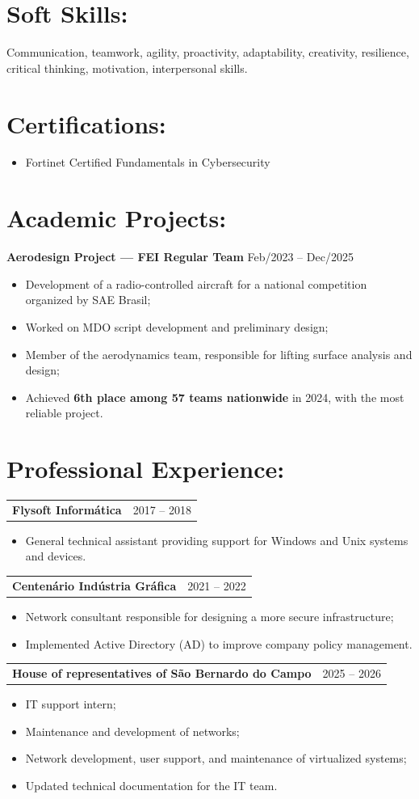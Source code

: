 \documentclass[11pt,a4paper]{article}
\makeatletter
\newcommand{\experience}[3]{
	\noindent
  \begin{tabular*}{\textwidth}{@{\extracolsep{\fill}}lr}
    \textbf{#1} & #2 \\
  \end{tabular*}
  \begin{itemize}
    #3
  \end{itemize}
}
\makeatother
\begin{document}
\section*{Soft Skills:}

Communication, teamwork, agility, proactivity, adaptability, creativity, resilience,
critical thinking, motivation, interpersonal skills.

\section*{Certifications:}
\begin{itemize}
	\item{Fortinet Certified Fundamentals in Cybersecurity}
\end{itemize}

\section*{Academic Projects:}

\textbf{Aerodesign Project — FEI Regular Team} \hfill Feb/2023 -- Dec/2025

\begin{itemize}
  \item Development of a radio-controlled aircraft for a national competition organized by SAE Brasil;
  \item Worked on MDO script development and preliminary design;
  \item Member of the aerodynamics team, responsible for lifting surface analysis and design;
  \item Achieved \textbf{6th place among 57 teams nationwide} in 2024, with the most reliable project.
\end{itemize}

\section*{Professional Experience:}

\experience{Flysoft Informática}{2017 -- 2018}
{
  \item General technical assistant providing support for Windows and Unix systems and devices.
}
\experience{Centenário Indústria Gráfica}{2021 -- 2022}
{
  \item Network consultant responsible for designing a more secure infrastructure;
  \item Implemented Active Directory (AD) to improve company policy management.
}
\experience{House of representatives of São Bernardo do Campo}{2025 -- 2026}
{
  \item IT support intern;
  \item Maintenance and development of networks;
  \item Network development, user support, and maintenance of virtualized systems;
  \item Updated technical documentation for the IT team.
}
\end{document}
